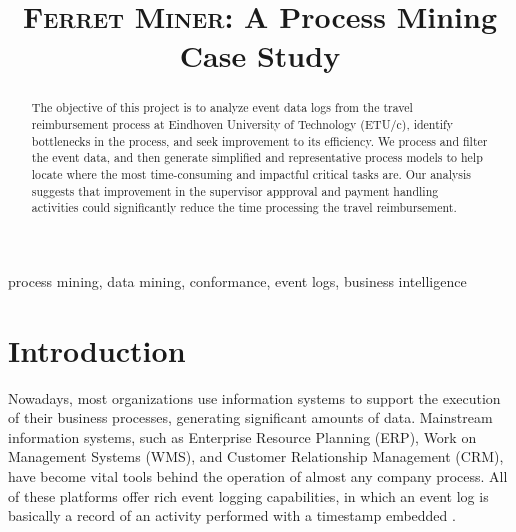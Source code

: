 \documentclass[conference]{IEEEtran}
\begin{document}
\title{\textsc{Ferret Miner}: A Process Mining Case Study}

\author{
\and
{}
\and
{}
\and
{}
}

\maketitle

\begin{abstract}
The objective of this project is to analyze event data logs from
the travel reimbursement process at Eindhoven University of Technology
(ETU/c), identify bottlenecks in the process, and
seek improvement to its efficiency.
We process and filter the event data, and then generate simplified and
representative process models to help locate where
the most time-consuming and impactful critical tasks are.
Our analysis suggests that
improvement in the supervisor appproval and payment handling activities 
could significantly
reduce the time processing the travel reimbursement.
\end{abstract}

\begin{IEEEkeywords}
process mining, data mining, conformance, event logs, business intelligence
\end{IEEEkeywords}

\section{Introduction}
\label{section-intro}


Nowadays, most organizations use information systems to support
the execution of their business processes, generating significant
amounts of data.
Mainstream information systems, such as Enterprise Resource
Planning (ERP), Work on Management Systems (WMS), and Customer
Relationship Management (CRM), have become vital tools behind the
operation of almost 
any company process\cite{Tuto2022}. All of these platforms
offer rich event logging capabilities, in which
an event log is
basically a record of an activity performed with a timestamp embedded
\cite{Proc2022}.
\end{document}
